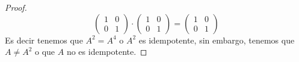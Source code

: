 \begin{enumerate}[label=\listAlph]
\begin{proof}
\[\begin{pmatrix}
                        1 & 0 \\
                        0 & 1
                    \end{pmatrix}
                    \cdot
                    \begin{pmatrix}
                        1 & 0 \\
                        0 & 1
                    \end{pmatrix}
                    =
                    \begin{pmatrix}
                        1 & 0 \\
                        0 & 1
                    \end{pmatrix}
                \]
                Es decir tenemos que \(A^2 = A^4\) o \(A^2\) es idempotente, sin embargo, tenemos que \(A \neq A^2\) o que \(A\) no es idempotente.
            \end{proof}
    \end{enumerate}
